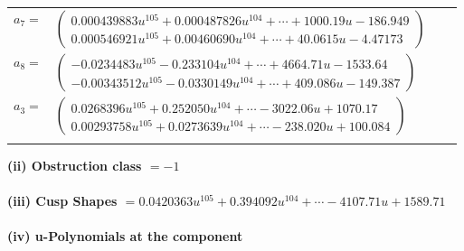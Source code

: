 \documentclass[1p]{elsarticle_modified}
\theoremstyle{definition}
\begin{document}
\begin{tabular}{m{7pt} m{180pt} m{7pt} m{180pt} }
\flushright $a_{7}=$&$\begin{pmatrix}0.000439883 u^{105}+0.000487826 u^{104}+\cdots+1000.19 u-186.949\\0.000546921 u^{105}+0.00460690 u^{104}+\cdots+40.0615 u-4.47173\end{pmatrix}$ \\
\flushright $a_{8}=$&$\begin{pmatrix}-0.0234483 u^{105}-0.233104 u^{104}+\cdots+4664.71 u-1533.64\\-0.00343512 u^{105}-0.0330149 u^{104}+\cdots+409.086 u-149.387\end{pmatrix}$ \\
\flushright $a_{3}=$&$\begin{pmatrix}0.0268396 u^{105}+0.252050 u^{104}+\cdots-3022.06 u+1070.17\\0.00293758 u^{105}+0.0273639 u^{104}+\cdots-238.020 u+100.084\end{pmatrix}$\\&\end{tabular}
\flushleft \textbf{(ii) Obstruction class $= -1$}\\~\\
\flushleft \textbf{(iii) Cusp Shapes $= 0.0420363 u^{105}+0.394092 u^{104}+\cdots-4107.71 u+1589.71$}\\~\\
\newpage\renewcommand{\arraystretch}{1}
\flushleft \textbf{(iv) u-Polynomials at the component}\newline \\
\end{document}
